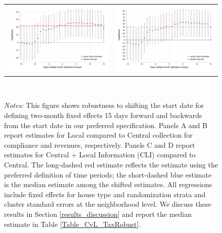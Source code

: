 \documentclass[12pt,english]{article}
\renewcommand{\footnotesize}{\fontsize{9pt}{11pt}\selectfont}\usepackage[unicode=true,
\begin{document}
\begin{figure}[H]
\begin{tabular}{cc}
\includegraphics[scale=0.45]{Output/shiftFE_compl_CvCLI.pdf}&\includegraphics[scale=0.45]{Output/shiftFE_rev_CvCLI.pdf}\\
\end{tabular}
\usebox{\tablebox}\\[1ex]
\parbox{6in}{\footnotesize \emph{Notes:} This figure shows robustness to shifting the start date for defining two-month fixed effects 15 days forward and backwards from the start date in our preferred specification. Panels A and B report estimates for Local compared to Central collection for compliance and revenues, respectively.  Panels C and D report estimates for Central + Local Information (CLI) compared to Central. The long-dashed red estimate reflects the estimate using the preferred definition of time periods; the short-dashed blue estimate is the median estimate among the shifted estimates. All regressions include fixed effects for house type and randomization strata and cluster standard errors at the neighborhood level. We discuss these results in Section \ref{results_discussion} and report the median estimate in Table \ref{Table_CvL_TaxRobust}.}
\end{figure}
\end{document}
